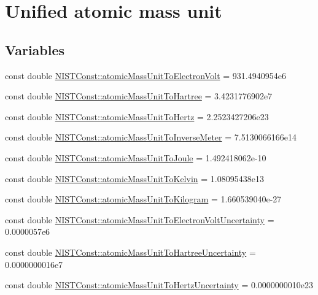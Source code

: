 \hypertarget{group___atomic_mass_unit}{}\section{Unified atomic mass unit}
\label{group___atomic_mass_unit}
\subsection*{Variables}
\begin{DoxyCompactItemize}
\item 
const double \hyperlink{group___atomic_mass_unit_ga4a5d912289e6a828a25e9e7ae3385b0d}{N\+I\+S\+T\+Const\+::atomic\+Mass\+Unit\+To\+Electron\+Volt} = 931.\+4940954e6
\item 
const double \hyperlink{group___atomic_mass_unit_ga8a6b352e1a13d0cbbc0f36f650e2c682}{N\+I\+S\+T\+Const\+::atomic\+Mass\+Unit\+To\+Hartree} = 3.\+4231776902e7
\item 
const double \hyperlink{group___atomic_mass_unit_gad284f1982f0182e1e4a90e0bff793af9}{N\+I\+S\+T\+Const\+::atomic\+Mass\+Unit\+To\+Hertz} = 2.\+2523427206e23
\item 
const double \hyperlink{group___atomic_mass_unit_gae1f5517810a5df9365d26887c04ada40}{N\+I\+S\+T\+Const\+::atomic\+Mass\+Unit\+To\+Inverse\+Meter} = 7.\+5130066166e14
\item 
const double \hyperlink{group___atomic_mass_unit_gaea7c1916a35df8824ac6a67be3f65f33}{N\+I\+S\+T\+Const\+::atomic\+Mass\+Unit\+To\+Joule} = 1.\+492418062e-\/10
\item 
const double \hyperlink{group___atomic_mass_unit_gaf9c3a2dfd69d4e74cee3361abd7d7ecf}{N\+I\+S\+T\+Const\+::atomic\+Mass\+Unit\+To\+Kelvin} = 1.\+08095438e13
\item 
const double \hyperlink{group___atomic_mass_unit_gafdd40d93803d15e1ff887dc12c49ca99}{N\+I\+S\+T\+Const\+::atomic\+Mass\+Unit\+To\+Kilogram} = 1.\+660539040e-\/27
\item 
const double \hyperlink{group___atomic_mass_unit_ga5b9ec7f36c14dabc54a16d1e076bee14}{N\+I\+S\+T\+Const\+::atomic\+Mass\+Unit\+To\+Electron\+Volt\+Uncertainty} = 0.\+0000057e6
\item 
const double \hyperlink{group___atomic_mass_unit_ga99d6950b6326e7131f95abe5c90fb8da}{N\+I\+S\+T\+Const\+::atomic\+Mass\+Unit\+To\+Hartree\+Uncertainty} = 0.\+0000000016e7
\item 
const double \hyperlink{group___atomic_mass_unit_gab009bca22e1cbed231798616f659b353}{N\+I\+S\+T\+Const\+::atomic\+Mass\+Unit\+To\+Hertz\+Uncertainty} = 0.\+0000000010e23

\end{DoxyCompactItemize}
